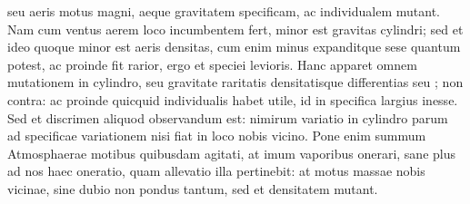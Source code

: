 \pstart {} seu aeris motus magni,  aeque gravitatem specificam\protect{}, ac individualem\protect{}  mutant. Nam cum ventus aerem loco incumbentem fert, minor est gravitas cylindri; sed et  ideo quoque minor est aeris densitas, cum  enim minus  expanditque sese  quantum potest, ac proinde fit rarior, ergo et  speciei levioris. Hanc apparet omnem mutationem in cylindro, seu gravitate  raritatis  densitatisque differentias seu ; non contra: ac proinde  quicquid individualis habet utile, id in specifica  largius inesse.
\pend 
\pstart  Sed et discrimen aliquod observandum  est: nimirum variatio in cylindro parum  ad specificae variationem  nisi fiat in loco nobis vicino. Pone enim  summum Atmosphaerae\protect{} motibus quibusdam  agitati, at imum vaporibus onerari,  sane plus ad nos haec oneratio, quam allevatio  illa pertinebit: at motus massae nobis vicinae,   sine dubio non pondus tantum, sed et densitatem  mutant.
\pend 
